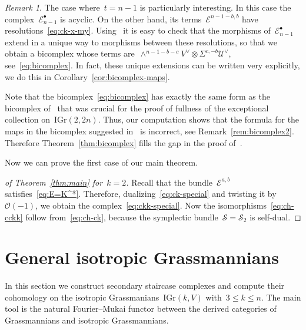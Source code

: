 \documentclass[a4paper]{article}
\newcommand{\Gr}{\mathrm{Gr}}
\newcommand{\IGr}{\mathrm{IGr}}
\newcommand{\cE}{\mathcal{E}}
\newcommand{\cK}{\mathcal{K}}
\newcommand{\cU}{\mathcal{U}}
\newcommand{\cS}{\mathcal{S}}
\newcommand{\cO}{\mathcal{O}}
\theoremstyle{remark}
\newtheorem{remark}[theorem]{Remark}
\theoremstyle{definition}
\begin{document}
\begin{remark}
\label{rem:bicomplex}
The case where~\(t = n - 1\) is particularly interesting.
In this case the complex~\(\cE_{n-1}^\bullet\) is acyclic.
On the other hand, its terms~\(\cE^{n-1-b,b}\) have resolutions~\eqref{eq:ck-x-my}.
Using~\cite[Lemma~5.1]{38} it is easy to check that the morphisms of~\(\cE_{n-1}^\bullet\)
extend in a unique way to morphisms between these resolutions,
so that we obtain a bicomplex whose terms are~\(\wedge^{n-1-b-c}V^\vee \otimes \Sigma^{c,-b}\cU^\vee\), see~\eqref{eq:bicomplex}.
In fact, these unique extensions can be written very explicitly, we do this in Corollary~\ref{cor:bicomplex-maps}.

Note that the bicomplex~\eqref{eq:bicomplex} has exactly the same form as the bicomplex of~\cite[Proposition~5.3]{lines} 
that was crucial for the proof of fullness of the exceptional collection on~\(\IGr(2,2n)\).
Thus, our computation shows that the formula for the maps in the bicomplex suggested in~\cite{lines} is incorrect, see Remark~\ref{rem:bicomplex2}. Therefore Theorem~\ref{thm:bicomplex} fills the gap in the proof of~\cite[Proposition~5.3]{lines}.
\end{remark}


Now we can prove the first case of our main theorem.



\begin{proof}[of Theorem~\textup{\ref{thm:main}} for~\(k = 2\)]
Recall that the bundle~\(\cE^{a,b}\) satisfies~\eqref{eq:E=K^*}.
Therefore, dualizing~\eqref{eq:ck-special} and twisting it by~\(\cO(-1)\), we obtain the complex~\eqref{eq:ckk-special}.
Now the isomorphisms~\eqref{eq:ch-cckk} follow from~\eqref{eq:ch-ck}, because the symplectic bundle~\(\cS = \cS_2\) is self-dual. 
\end{proof}


\section{General isotropic Grassmannians}

In this section we construct secondary staircase complexes and compute their cohomology
on the isotropic Grassmanians~\(\IGr(k,V)\) with~\(3 \le k \le n\).
The main tool is the natural Fourier--Mukai functor 
between the derived categories of Grassmannians and isotropic Grassmannians.
\end{document}
